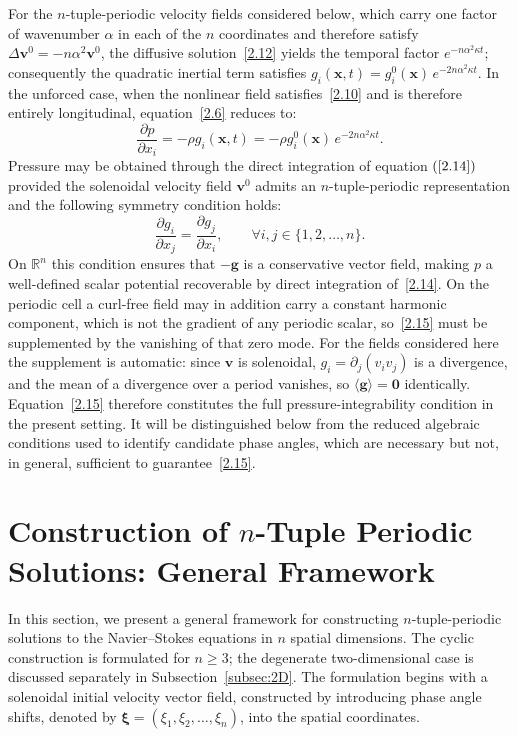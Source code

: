 \documentclass[11pt]{jfm}
\let\ge=\geqslant  \let\geq=\geqslant
\numberwithin{equation}{section}
\begin{document}
For the $n$-tuple-periodic velocity fields considered below, which carry one factor of wavenumber
$\alpha$ in each of the $n$ coordinates and therefore satisfy
$\Delta\boldsymbol{v}^0=-n\alpha^2\boldsymbol{v}^0$, the diffusive solution~\eqref{2.12} yields the
temporal factor $e^{-n\alpha^2\kappa t}$; consequently the quadratic inertial term satisfies
$g_i(\boldsymbol{x},t)=g_i^0(\boldsymbol{x})\,e^{-2n\alpha^2\kappa t}$. In the unforced case, when
the nonlinear field satisfies~\eqref{2.10} and is therefore entirely longitudinal,
equation~\eqref{2.6} reduces to:
\begin{equation}
\label{2.14}
\frac{\partial p}{\partial x_i} = -\rho g_i(\boldsymbol{x},t)  = -\rho g_i^0(\boldsymbol{x})  \, e^{-2n \alpha^2 \kappa t}.
\end{equation}
Pressure may be obtained through the direct integration of equation $\left(\ref{2.14}\right)$ provided the solenoidal velocity field \( \boldsymbol{v}^0 \) admits an \( n \)-tuple-periodic representation and the following symmetry condition holds:
\begin{equation}
\label{2.15}
\frac{\partial g_i}{\partial x_j} = \frac{\partial g_j}{\partial x_i}, \qquad \forall i, j \in \{1, 2, \dots, n\}.
\end{equation}
On $\mathbb{R}^n$ this condition ensures that $-\boldsymbol{g}$ is a conservative vector field,
making $p$ a well-defined scalar potential recoverable by direct integration of~\eqref{2.14}. On
the periodic cell a curl-free field may in addition carry a constant harmonic component, which is
not the gradient of any periodic scalar, so~\eqref{2.15} must be supplemented by the vanishing of
that zero mode. For the fields considered here the supplement is automatic: since
$\boldsymbol{v}$ is solenoidal, $g_i=\partial_j(v_iv_j)$ is a divergence, and the mean of a
divergence over a period vanishes, so $\langle\boldsymbol{g}\rangle=\boldsymbol{0}$ identically.
Equation~\eqref{2.15} therefore constitutes the full pressure-integrability condition in the
present setting. It will be distinguished below from the reduced algebraic conditions used to identify candidate phase angles, which are necessary but not, in general, sufficient to guarantee~\eqref{2.15}.
\section{Construction of $n$-Tuple Periodic Solutions: General Framework}
\label{sec:construction}
In this section, we present a general framework for constructing $n$-tuple-periodic solutions to the Navier--Stokes equations in $n$ spatial dimensions. The cyclic construction is formulated for $n\ge 3$; the degenerate two-dimensional case is discussed separately in Subsection~\ref{subsec:2D}. The formulation begins with a solenoidal initial velocity vector field, constructed by introducing phase angle shifts, denoted by $\boldsymbol{\xi} = (\xi_1, \xi_2, \dots, \xi_n)$, into the spatial coordinates.
\end{document}
